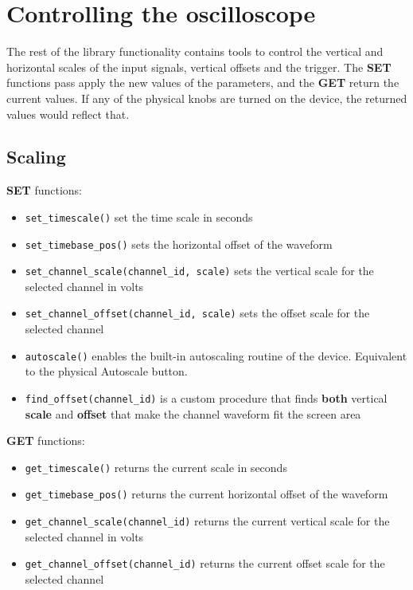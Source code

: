 \section{Controlling the oscilloscope}

The rest of the library functionality contains tools to control the vertical and horizontal scales of the input signals, vertical offsets and the trigger. The \textbf{SET} functions pass apply the new values of the parameters, and the \textbf{GET} return the current values. If any of the physical knobs are turned on the device, the returned values would reflect that.

\subsection*{Scaling}

\textbf{SET} functions:
\begin{itemize}
    
    \item \verb|set_timescale()| set the time scale in seconds
    \item \verb|set_timebase_pos()| sets the horizontal offset of the waveform
    \item \verb|set_channel_scale(channel_id, scale)| sets the vertical scale for the selected channel in volts
    \item \verb|set_channel_offset(channel_id, scale)| sets the offset scale for the selected channel
    \item \verb|autoscale()| enables the built-in autoscaling routine of the device. Equivalent to the physical Autoscale button.
    \item \verb|find_offset(channel_id)| is a custom procedure that finds \textbf{both} vertical \textbf{scale} and \textbf{offset} that make the channel waveform fit the screen area

\end{itemize}

\noindent\textbf{GET} functions:

\begin{itemize}
    
    \item \verb|get_timescale()| returns the current scale in seconds
    \item \verb|get_timebase_pos()| returns the current horizontal offset of the waveform
    \item \verb|get_channel_scale(channel_id)| returns the current vertical scale for the selected channel in volts
    \item \verb|get_channel_offset(channel_id)| returns the current offset scale for the selected channel

\end{itemize}


